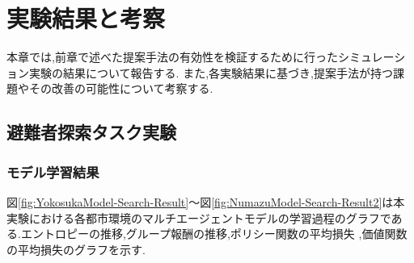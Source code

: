 \chapter{実験結果と考察}
本章では,前章で述べた提案手法の有効性を検証するために行ったシミュレーション実験の結果について報告する.
また,各実験結果に基づき,提案手法が持つ課題やその改善の可能性について考察する.

\section{避難者探索タスク実験}
\subsection{モデル学習結果}
図\ref{fig:YokosukaModel-Search-Result}～図\ref{fig:NumazuModel-Search-Result2}は本実験における各都市環境のマルチエージェントモデルの学習過程のグラフである.エントロピーの推移,グループ報酬の推移,ポリシー関数の平均損失
,価値関数の平均損失のグラフを示す.
